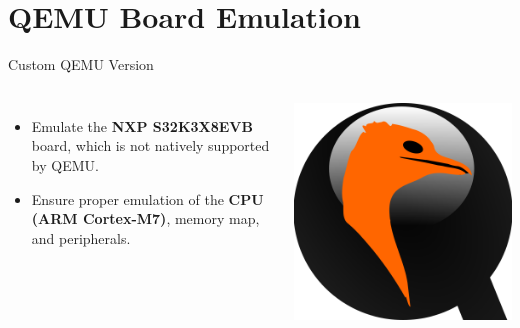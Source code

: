
\section{QEMU Board Emulation}

\begin{frame}{Custom QEMU Version}
    \begin{columns}
        \begin{itemize}
            \item Emulate the \textbf{NXP S32K3X8EVB} board, which is not natively supported by QEMU.
            \item Ensure proper emulation of the \textbf{CPU (ARM Cortex-M7)}, memory map, and peripherals.
        \end{itemize}
        \centering
        \includegraphics[width=0.7\linewidth]{../images/qemu_logo_1.png}
    \end{columns}
\end{frame}

